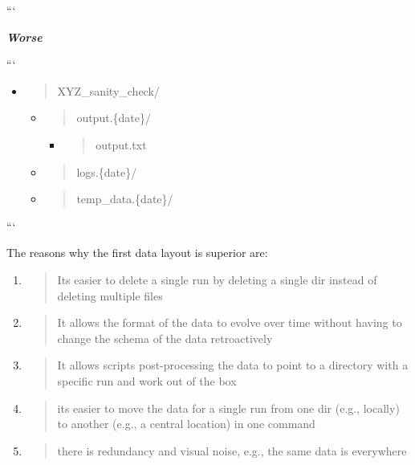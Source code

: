 \documentclass[11pt, reqno]{amsart}
\begin{document}
```

\emph{\textbf{Worse}}

```

\begin{itemize}
\item
  \begin{quote}
  XYZ\_sanity\_check/
  \end{quote}

  \begin{itemize}
  \item
    \begin{quote}
    output.\{date\}/
    \end{quote}

    \begin{itemize}
    \item
      \begin{quote}
      output.txt
      \end{quote}
    \end{itemize}
  \item
    \begin{quote}
    logs.\{date\}/
    \end{quote}
  \item
    \begin{quote}
    temp\_data.\{date\}/
    \end{quote}
  \end{itemize}
\end{itemize}

```

The reasons why the first data layout is superior are:

\begin{enumerate}
\def\labelenumi{\arabic{enumi})}
\item
  \begin{quote}
  It\textquotesingle s easier to delete a single run by deleting a
  single dir instead of deleting multiple files
  \end{quote}
\item
  \begin{quote}
  It allows the format of the data to evolve over time without having to
  change the schema of the data retroactively
  \end{quote}
\item
  \begin{quote}
  It allows scripts post-processing the data to point to a directory
  with a specific run and work out of the box
  \end{quote}
\item
  \begin{quote}
  it\textquotesingle s easier to move the data for a single run from one
  dir (e.g., locally) to another (e.g., a central location) in one
  command
  \end{quote}
\item
  \begin{quote}
  there is redundancy and visual noise, e.g., the same data is
  everywhere
  \end{quote}
\end{enumerate}
\end{document}
